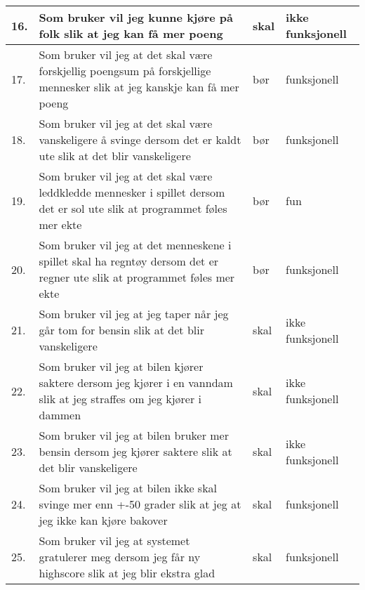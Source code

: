 \documentclass[fontsize=11pt]{scrartcl}
\begin{document}
\begin{center}
\begin{tabular}{ | m{0.4cm} | m{7cm} | m{2.5cm} | m{3cm} | }
\end{tabular}

\begin{tabular}{ | m{0.4cm} | m{7cm} | m{2cm} | m{2cm} | }
\hline


16. & Som bruker vil jeg kunne kjøre på folk slik at jeg kan få mer poeng 
& skal & ikke funksjonell 
\\ \hline
17. & Som bruker vil jeg at det skal være forskjellig poengsum på forskjellige
mennesker slik at jeg kanskje kan få mer poeng & bør & funksjonell 
\\ \hline
18. & Som bruker vil jeg at det skal være vanskeligere å svinge dersom det er
kaldt ute slik at det blir vanskeligere & bør & funksjonell 
\\ \hline
19. & Som bruker vil jeg at det skal være leddkledde mennesker i spillet dersom
det er sol ute slik at programmet føles mer ekte & bør & fun 
\\ \hline
20. & Som bruker vil jeg at det menneskene i spillet skal ha regntøy dersom
det er regner ute slik at programmet føles mer ekte & bør & funksjonell
\\ \hline
21. & Som bruker vil jeg at jeg taper når jeg går tom for bensin slik at det
blir vanskeligere & skal & ikke funksjonell
\\ \hline
22. & Som bruker vil jeg at bilen kjører saktere dersom jeg kjører i en vanndam
slik at jeg straffes om jeg kjører i dammen & skal & ikke funksjonell
\\ \hline
23. & Som bruker vil jeg at bilen bruker mer bensin dersom jeg kjører saktere
slik at det blir vanskeligere & skal & ikke funksjonell
\\ \hline
24. & Som bruker vil jeg at bilen ikke skal svinge mer enn +-50 grader slik at
jeg at jeg ikke kan kjøre bakover & skal & funksjonell 
\\ \hline
25. & Som bruker vil jeg at systemet gratulerer meg dersom jeg får ny highscore
slik at jeg blir ekstra glad & skal & funksjonell 
\\ \hline
\end{tabular}
\end{center}
\end{document}
